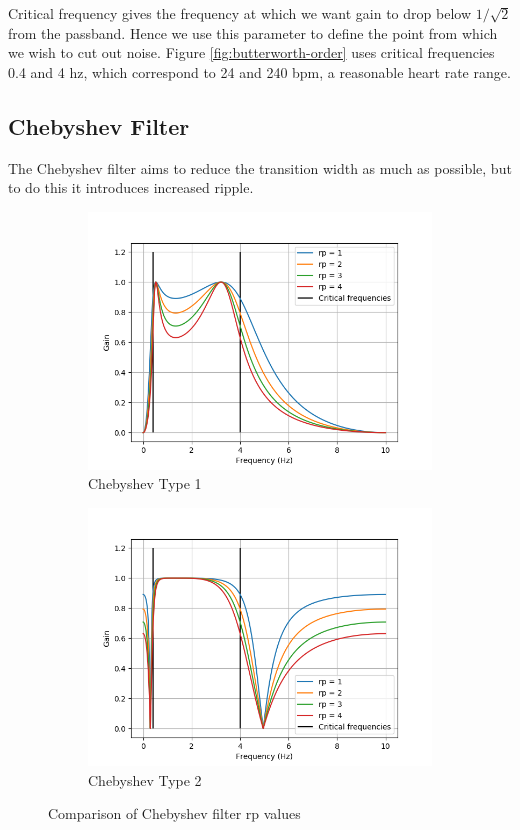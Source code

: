 \documentclass[12pt,a4paper,twoside,openany]{report}
\begin{document}
Critical frequency gives the frequency at which we want gain to drop below
\(1/\sqrt2\) from the passband. Hence we use this parameter to define the
point from which we wish to cut out noise. Figure \ref{fig:butterworth-order}
uses critical frequencies 0.4 and 4 hz, which correspond to 24 and 240 bpm, a
reasonable heart rate range.

\subsection{Chebyshev Filter}

The Chebyshev filter aims to reduce the transition width as much as possible,
but to do this it introduces increased ripple.

\begin{figure}[h]
\begin{subfigure}{.5\textwidth}
  \centering
  \includegraphics[width=\linewidth]{figs/cheby1-rp-comparison.png}
  \caption{Chebyshev Type 1}
  \label{fig:cheby1rs}
\end{subfigure}%
\begin{subfigure}{.5\textwidth}
  \centering
  \includegraphics[width=\linewidth]{figs/cheby2-rp-comparison.png}
  \caption{Chebyshev Type 2}
  \label{fig:cheby2rs}
\end{subfigure}
\caption{Comparison of Chebyshev filter rp values}
\label{fig:chebyrp}
\end{figure}
\end{document}

